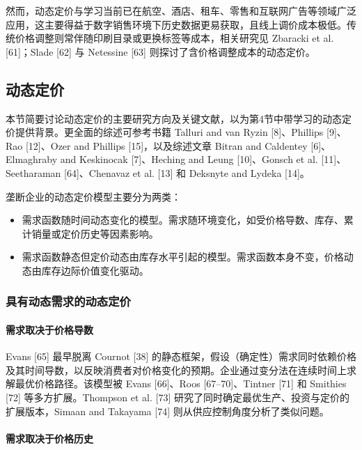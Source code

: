 然而，动态定价与学习当前已在航空、酒店、租车、零售和互联网广告等领域广泛应用，这主要得益于数字销售环境下历史数据更易获取，且线上调价成本极低。传统价格调整则常伴随印刷目录或更换标签等成本，相关研究见 Zbaracki et al. [61]；Slade [62] 与 Netessine [63] 则探讨了含价格调整成本的动态定价。


\subsection{动态定价}\label{dynamic-pricing}

本节简要讨论动态定价的主要研究方向及关键文献，以为第4节中带学习的动态定价提供背景。更全面的综述可参考书籍 Talluri and van Ryzin [8]、Phillips [9]、Rao [12]、Ozer and Phillips [15]，以及综述文章 Bitran and Caldentey [6]、Elmaghraby and Keskinocak [7]、Heching and Leung [10]、Gonsch et al. [11]、Seetharaman [64]、Chenavaz et al. [13] 和 Deksnyte and Lydeka [14]。

垄断企业的动态定价模型主要分为两类：

\begin{itemize}
	\item  需求函数随时间动态变化的模型。需求随环境变化，如受价格导数、库存、累计销量或定价历史等因素影响。
	\item 需求函数静态但定价动态由库存水平引起的模型。需求函数本身不变，价格动态由库存边际价值变化驱动。
\end{itemize}

\subsubsection{具有动态需求的动态定价}\label{dynamic-pricing-with-dynamic-demand}

\paragraph{需求取决于价格导数}\label{demand-depends-on-price-derivatives}

Evans [65] 最早脱离 Cournot [38] 的静态框架，假设（确定性）需求同时依赖价格及其时间导数，以反映消费者对价格变化的预期。企业通过变分法在连续时间上求解最优价格路径。该模型被 Evans [66]、Roos [67–70]、Tintner [71] 和 Smithies [72] 等多方扩展。Thompson et al. [73] 研究了同时确定最优生产、投资与定价的扩展版本，Simaan and Takayama [74] 则从供应控制角度分析了类似问题。

\paragraph{需求取决于价格历史}\label{demand-depends-on-price-history}

